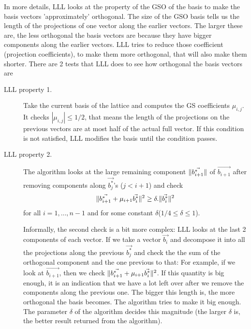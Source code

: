 \begin{description}
            In more details, LLL looks at the property of the GSO of the basis
            to make the basis vectors 'approximately' orthogonal. The size of
            the GSO basis tells us the length of the projections of one vector
            along the earlier vectors. The larger these are, the less orthogonal
            the basis vectors are because they have bigger components along the
            earlier vectors. LLL tries to reduce those coefficient (projection
            coefficients), to make them more orthogonal, that will also make
            them shorter. There are 2 tests that LLL does to see how orthogonal
            the basis vectors are
            \begin{description}
                \item [LLL property 1.] Take the current basis of the lattice
                    and computes the GS coefficients $\mu_{i,j}$. It checks
                    $|\mu_{i,j}| \leq 1/2$, that means the length of the
                    projections on the previous vectors are at most half of the
                    actual full vector. If this condition is not satisfied, LLL modifies
                    the basis until the condition passes.
                \item [LLL property 2.] The algorithm looks at the large
                    remaining component $\Vert \vec{b_{i+1}^*} \Vert$ of
                    $\vec{b_{i+1}}$ after removing components along
                    $\vec{b_j^*}$'s ($j < i + 1$) and check
                    \[
                        \Vert \vec{b_{i+1}^*}+\mu_{i+1}\vec{b_i^*} \Vert^2 \geq
                        \delta . \Vert \vec{b_i^*} \Vert^2
                    \]
                    for all $i=1,\dots,n-1$ and for some constant
                    $\delta$($1/4 \leq \delta \leq 1$).

                    Informally, the second check is a bit more complex:
                    LLL looks at the last 2 components of each vector. If we
                    take a vector $\vec{b_i}$ and decompose it into all the
                    projections along the previous $\vec{b_j^*}$ and check the
                    the sum of the orthogonal component and the one previous to
                    that: For example, if we look at $\vec{b_{i+1}}$, then we
                    check $\Vert \vec{b_{i+1}^*}+\mu_{i+1}\vec{b_i^*} \Vert^2$. If
                    this quantity is big enough, it is an indication that we
                    have a lot left over after we remove the components along
                    the previous one. The bigger this length is, the more orthogonal the
                    basis becomes. The algorithm tries to make it big enough.
                    The parameter $\delta$ of the algorithm decides this
                    magnitude (the larger $\delta$ is, the better result
                    returned from the algorithm).


\end{description}
\end{description}
